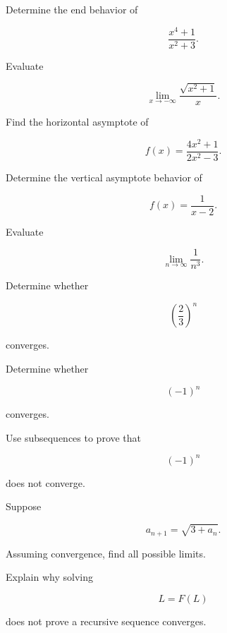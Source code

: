 \begin{exercise}[2]
Determine the end behavior of

\[
\frac{x^4+1}{x^2+3}.
\]
\end{exercise}

\begin{exercise}[2]
Evaluate

\[
\lim_{x\to-\infty}
\frac{\sqrt{x^2+1}}{x}.
\]
\end{exercise}

\begin{exercise}[2]
Find the horizontal asymptote of

\[
f(x)
=
\frac{4x^2+1}{2x^2-3}.
\]
\end{exercise}

\begin{exercise}[2]
Determine the vertical asymptote behavior of

\[
f(x)
=
\frac{1}{x-2}.
\]
\end{exercise}

\begin{exercise}[2]
Evaluate

\[
\lim_{n\to\infty}
\frac1{n^3}.
\]
\end{exercise}

\begin{exercise}[2]
Determine whether

\[
\left(
\frac23
\right)^n
\]

converges.
\end{exercise}

\begin{exercise}[2]
Determine whether

\[
(-1)^n
\]

converges.
\end{exercise}

\begin{exercise}[3]
Use subsequences to prove that

\[
(-1)^n
\]

does not converge.
\end{exercise}

\begin{exercise}[3]
Suppose

\[
a_{n+1}
=
\sqrt{3+a_n}.
\]

Assuming convergence, find all possible limits.
\end{exercise}

\begin{exercise}[3]
Explain why solving

\[
L=F(L)
\]

does not prove a recursive sequence converges.
\end{exercise}

